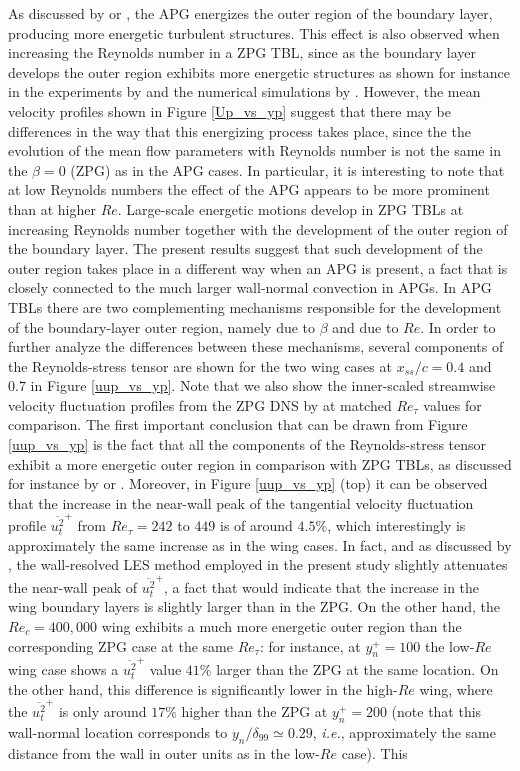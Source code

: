 \documentclass[preprint,12pt,authoryear]{elsarticle}
\begin{document}
As discussed by \cite{harun_et_al} or \cite{bobke_et_al}, the APG energizes the outer region of the boundary layer, producing more energetic turbulent structures. This effect is also observed when increasing the Reynolds number in a ZPG TBL, since as the boundary layer develops the outer region exhibits more energetic structures as shown for instance in the experiments by \cite{hutchins_marusic} and the numerical simulations by \cite{eitel_amor_et_al}. However, the mean velocity profiles shown in Figure \ref{Up_vs_yp} suggest that there may be differences in the way that this energizing process takes place, since the the evolution of the mean flow parameters with Reynolds number is not the same in the $\beta=0$ (ZPG) as in the APG cases. In particular, it is interesting to note that at low Reynolds numbers the effect of the APG appears to be more prominent than at higher $Re$. Large-scale energetic motions develop in ZPG TBLs at increasing Reynolds number together with the development of the outer region of the boundary layer. The present results suggest that such development of the outer region takes place in a different way when an APG is present, a fact that is closely connected to the much larger wall-normal convection in APGs. In APG TBLs there are two complementing mechanisms responsible for the development of the boundary-layer outer region, namely due to $\beta$ and due to $Re$. In order to further analyze the differences between these mechanisms, several components of the Reynolds-stress tensor are shown for the two wing cases at $x_{ss}/c=0.4$ and $0.7$ in Figure \ref{uup_vs_yp}. Note that we also show the inner-scaled streamwise velocity fluctuation profiles from the ZPG DNS by \cite{schlatter_orlu10} at matched $Re_{\tau}$ values for comparison. The first important conclusion that can be drawn from Figure \ref{uup_vs_yp} is the fact that all the components of the Reynolds-stress tensor exhibit a more energetic outer region in comparison with ZPG TBLs, as discussed for instance by \cite{kitsios_et_al} or \cite{bobke_et_al}. Moreover, in Figure \ref{uup_vs_yp} (top) it can be observed that the increase in the near-wall peak of the tangential velocity fluctuation profile $\overline{u^{2}_{t}}^{+}$ from $Re_{\tau}=242$ to $449$ is of around $4.5\%$, which interestingly is approximately the same increase as in the wing cases. In fact, and as discussed by \cite{eitel_amor_et_al}, the wall-resolved LES method employed in the present study slightly attenuates the near-wall peak of $\overline{u^{2}_{t}}^{+}$, a fact that would indicate that the increase in the wing boundary layers is slightly larger than in the ZPG. On the other hand, the $Re_{c}=400,000$ wing exhibits a much more energetic outer region than the corresponding ZPG case at the same $Re_{\tau}$: for instance, at $y^{+}_{n} = 100$ the low-$Re$ wing case shows a $\overline{u^{2}_{t}}^{+}$ value $41\%$ larger than the ZPG at the same location. On the other hand, this difference is significantly lower in the high-$Re$ wing, where the $\overline{u^{2}_{t}}^{+}$ is only around $17\%$ higher than the ZPG at $y^{+}_{n}=200$ (note that this wall-normal location corresponds to $y_{n}/\delta_{99} \simeq 0.29$, {\it i.e.}, approximately the same distance from the wall in outer units as in the low-$Re$ case). This 
\end{document}
